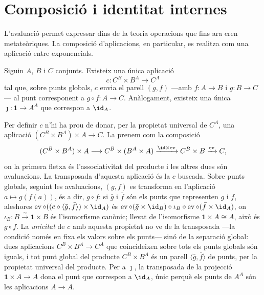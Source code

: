 \section{Composició i identitat internes}\label{sec:composicio-interna}

L'avaluació permet expressar dins de la teoria operacions que fins ara
eren metateòriques. La composició d'aplicacions, en particular, es
realitza com una aplicació entre exponencials.

\begin{proposicio}\label{prop:composicio-interna}
Siguin \(A\), \(B\) i \(C\) conjunts. Existeix una única aplicació
\[
c\colon C^{B}\times B^{A}\to C^{A}
\]
tal que, sobre punts globals, \(c\) envia el parell \((g,f)\) ---amb
\(f\colon A\to B\) i \(g\colon B\to C\)--- al punt corresponent a
\(g\circ f\colon A\to C\). Anàlogament, existeix una única
\(\jmath\colon\mathbf1\to A^{A}\) que correspon a \(\id_A\).
\end{proposicio}

\begin{prova}
Per definir \(c\) n'hi ha prou de donar, per la propietat universal de
\(C^{A}\), una aplicació \((C^{B}\times B^{A})\times A\to C\). La prenem
com la composició
\[
(C^{B}\times B^{A})\times A
\longrightarrow
C^{B}\times(B^{A}\times A)
\xrightarrow{\id\times\operatorname{ev}}
C^{B}\times B
\xrightarrow{\operatorname{ev}}
C,
\]
on la primera fletxa és l'associativitat del producte i les altres dues
són avaluacions. La transposada d'aquesta aplicació és la \(c\) buscada.
Sobre punts globals, seguint les avaluacions, \((g,f)\) es transforma en
l'aplicació \(a\mapsto g(f(a))\), és a dir, \(g\circ f\): si \(\bar g\) i
\(\bar f\) són els punts que representen \(g\) i \(f\), aleshores
\(\operatorname{ev}\circ((c\circ\langle\bar g,\bar f\rangle)\times\id_A)\)
és \(\operatorname{ev}\circ(\bar g\times\id_B)\circ\iota_B\circ\operatorname{ev}\circ(\bar f\times\id_A)\),
on \(\iota_B\colon B\xrightarrow{\sim}\mathbf1\times B\) és l'isomorfisme
canònic; llevat de l'isomorfisme \(\mathbf1\times A\cong A\), això és
\(g\circ f\).
La \emph{unicitat} de \(c\) amb aquesta propietat no ve de la transposada
---la condició només en fixa els valors sobre els punts--- sinó de la
separació global: dues aplicacions \(C^B\times B^A\to C^A\) que
coincideixen sobre tots els punts globals són iguals, i tot punt global
del producte \(C^B\times B^A\) és un parell \(\langle\bar g,\bar f\rangle\)
de punts, per la propietat universal del producte. Per a \(\jmath\), la
transposada de la projecció \(\mathbf1\times A\to A\) dona el punt que
correspon a \(\id_A\), únic perquè els punts de \(A^A\) són les aplicacions
\(A\to A\).
\end{prova}

